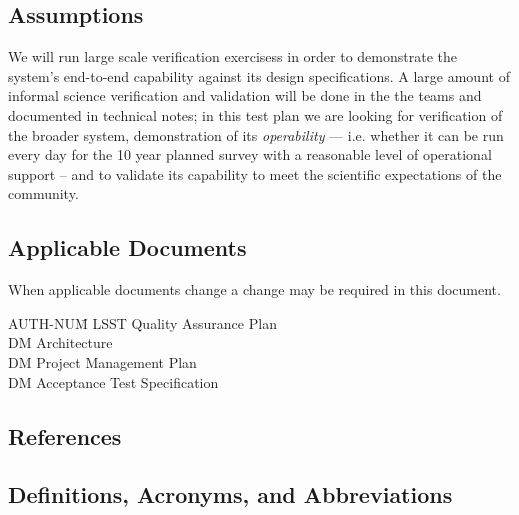 \subsection{Assumptions}

We will run large scale verification exercisess in order to demonstrate the system's end-to-end capability against its design specifications.
A large amount of informal science verification and validation will be done in the the teams and documented in technical notes; in this test plan we are looking for verification of the broader system, demonstration of its \emph{operability} --- i.e. whether it can be run every day for the 10 year planned survey with a reasonable level of operational support --  and to validate its capability to meet the scientific expectations of the community.

\subsection{Applicable Documents \label{sect:ad}}

When applicable documents change a change may be required in this document.
\begin{tabbing}
AUTH-NUM\= \kill
{} \>	LSST Quality  Assurance Plan \\
 \>	DM Architecture\\
 \>	DM Project Management Plan   \\
 \>	DM Acceptance Test Specification \\
\end{tabbing}

\subsection{References}

\renewcommand{\refname}{}


\subsection{Definitions, Acronyms, and Abbreviations \label{sect:acronyms}}
\phantom{ } %

